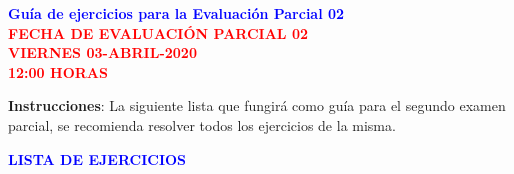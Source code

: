 \documentclass[12pt]{report}
\numberwithin{section}{chapter}
\begin{document}
\begin{center}
\textcolor{blue}{\textbf{\large Guía de ejercicios para la Evaluación Parcial 02}}\\
\vspace{0.5 cm}
\textcolor{red}{\textbf{\large FECHA DE EVALUACIÓN PARCIAL 02 \\ VIERNES 03-ABRIL-2020\\ 12:00 HORAS}}
\end{center}

\textbf{Instrucciones}: La siguiente lista que fungirá como guía para el segundo examen parcial, se recomienda resolver todos los ejercicios de la misma.

\vspace{1cm}


\begin{center}
\textcolor{blue}{\textbf{\large LISTA DE EJERCICIOS}}
\end{center}
\end{document}
